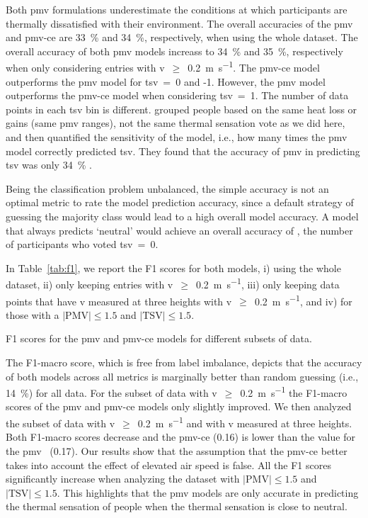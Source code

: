 Both \ac{pmv} formulations underestimate the conditions at which participants are thermally dissatisfied with their environment.
The overall accuracies of the \ac{pmv} and \ac{pmv-ce} are \qty{33}{\percent} and \qty{34}{\percent}, respectively, when using the whole dataset.
The overall accuracy of both \ac{pmv} models increass to \qty{34}{\percent} and \qty{35}{\percent}, respectively when only considering entries with \ac{v}~$\geq$~\qty{0.2}{\m\per\s}.
The \ac{pmv-ce} model outperforms the \ac{pmv} model for \ac{tsv}~=~0 and -1.
However, the \ac{pmv} model outperforms the \ac{pmv-ce} model when considering \ac{tsv}~=~1.
The number of data points in each \ac{tsv} bin is different.
 grouped people based on the same heat loss or gains (same \ac{pmv} ranges), not the same thermal sensation vote as we did here, and then quantified the sensitivity of the model, i.e., how many times the \ac{pmv} model correctly predicted \ac{tsv}.
They found that the accuracy of \ac{pmv} in predicting \ac{tsv} was only \qty{34}{\percent} .

Being the classification problem unbalanced, the simple accuracy is not an optimal metric to rate the model prediction accuracy, since a default strategy of guessing the majority class would lead to a high overall model accuracy.
A model that always predicts `neutral' would achieve an overall accuracy of , the number of participants who voted \ac{tsv}~=~0.

In Table~\ref{tab:f1}, we report the F1 scores for both models, i) using the whole dataset, ii) only keeping entries with \ac{v}~$\geq$~\qty{0.2}{\m\per\s}, iii) only keeping data points that have \ac{v} measured at three heights with \ac{v}~$\geq$~\qty{0.2}{\m\per\s}, and iv) for those with a $\lvert \textrm{PMV}\lvert \leq 1.5$ and $\lvert \textrm{TSV}\lvert \leq 1.5$.
\begin{table}[htb!]
    \centering
    
    \caption{F1 scores for the \ac{pmv} and \ac{pmv-ce} models for different subsets of data.}
    \label{tab:f1}
\end{table}
The F1-macro score, which is free from label imbalance, depicts that the accuracy of both models across all metrics is marginally better than random guessing (i.e., \qty{14}{\percent}) for all data.
For the subset of data with \ac{v}~$\geq$~\qty{0.2}{\m\per\s} the F1-macro scores of the \ac{pmv} and \ac{pmv-ce} models only slightly improved.
We then analyzed the subset of data with \ac{v}~$\geq$~\qty{0.2}{\m\per\s} and with \ac{v} measured at three heights.
Both F1-macro scores decrease and the \ac{pmv-ce} (\num{0.16}) is lower than the value for the \ac{pmv}~ (\num{0.17}).
Our results show that the assumption that the \ac{pmv-ce} better takes into account the effect of elevated air speed is false.
All the F1 scores significantly increase when analyzing the dataset with $\lvert \textrm{PMV}\lvert \leq 1.5$ and $\lvert \textrm{TSV}\lvert \leq 1.5$.
This highlights that the \ac{pmv} models are only accurate in predicting the thermal sensation of people when the thermal sensation is close to neutral.

